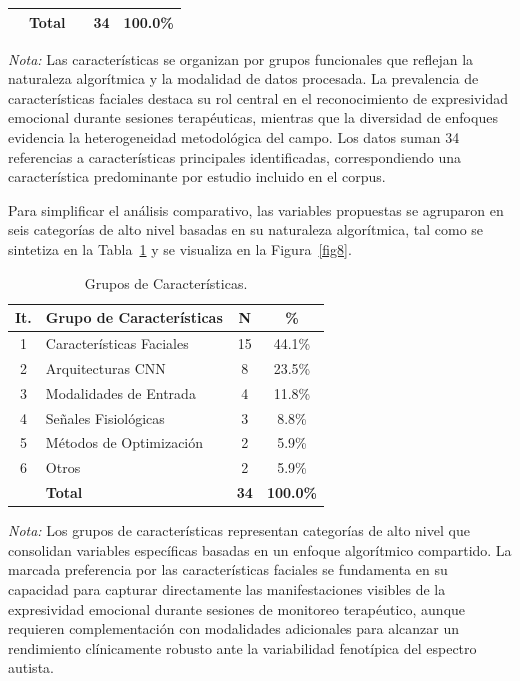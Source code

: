 \documentclass[ASNA,twocolumn]{USG}
\begin{document}
\begin{table}[!t]
{\begin{tabular*}{\textwidth}{@{\extracolsep\fill}cllcc@{\extracolsep\fill}}
				& \textbf{Total}            &                                          & \textbf{34} & \textbf{100.0\%} \\
				\bottomrule
		\end{tabular*}}
		\begin{tablenotes}
			\item {\it Nota:} Las características se organizan por grupos funcionales que
			reflejan la naturaleza algorítmica y la modalidad de datos procesada. La prevalencia
			de características faciales destaca su rol central en el reconocimiento de
			expresividad emocional durante sesiones terapéuticas, mientras que la diversidad
			de enfoques evidencia la heterogeneidad metodológica del campo. Los datos suman 34
			referencias a características principales identificadas, correspondiendo una
			característica predominante por estudio incluido en el corpus.
		\end{tablenotes}
	\end{table}
	
	Para simplificar el análisis comparativo, las variables propuestas se agruparon en
	seis categorías de alto nivel basadas en su naturaleza algorítmica, tal como se
	sintetiza en la Tabla~\ref{tab12} y se visualiza en la Figura~\ref{fig8}.
	
	\begin{table}[!ht]
		\centering
		\caption{Grupos de Características.\label{tab12}}
		{\setlength{\tabcolsep}{4pt}
			\begin{tabular*}{\columnwidth}{@{\extracolsep\fill}clcc@{\extracolsep\fill}}
				\toprule
				\textbf{It.} & \textbf{Grupo de Características} & \textbf{N} & \textbf{\%} \\
				\midrule
				1 & Características Faciales  & 15 & 44.1\% \\
				2 & Arquitecturas CNN         & 8  & 23.5\% \\
				3 & Modalidades de Entrada    & 4  & 11.8\% \\
				4 & Señales Fisiológicas      & 3  & 8.8\%  \\
				5 & Métodos de Optimización   & 2  & 5.9\%  \\
				6 & Otros                     & 2  & 5.9\%  \\
				& \textbf{Total}            & \textbf{34} & \textbf{100.0\%} \\
				\bottomrule
		\end{tabular*}}
		\begin{tablenotes}
			\item {\it Nota:} Los grupos de características representan categorías de alto
			nivel que consolidan variables específicas basadas en un enfoque algorítmico
			compartido. La marcada preferencia por las características faciales se fundamenta
			en su capacidad para capturar directamente las manifestaciones visibles de la
			expresividad emocional durante sesiones de monitoreo terapéutico, aunque requieren
			complementación con modalidades adicionales para alcanzar un rendimiento clínicamente
			robusto ante la variabilidad fenotípica del espectro autista.
		\end{tablenotes}
	\end{table}
	
\end{document}
